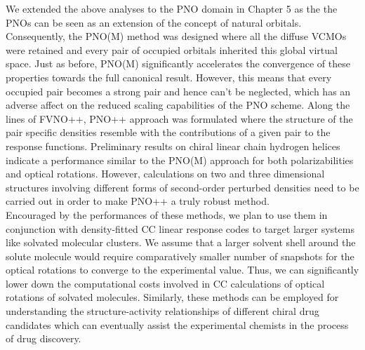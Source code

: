 We extended the above analyses to the PNO domain in Chapter 5 as the  
the PNOs can be seen as an extension of the concept of 
natural orbitals. Consequently, the PNO(M) method was designed where
all the diffuse VCMOs were retained and every pair of occupied orbitals
inherited this global virtual space. Just as before, PNO(M) significantly
accelerates the convergence of these properties towards the full
canonical result. However, this means that every occupied pair becomes a 
strong pair and hence can't be neglected, which has an adverse affect
on the reduced scaling capabilities of the PNO scheme. Along the 
lines of FVNO++, PNO++ approach was formulated where the structure of 
the pair specific densities resemble with the contributions of a given
pair to the response functions. Preliminary results on chiral linear chain 
hydrogen helices indicate a performance similar to the PNO(M) approach
for both polarizabilities and optical rotations. However, calculations on 
two and three dimensional structures involving different forms of second-order 
perturbed densities need to be carried out in order to make PNO++ a truly robust method. \\
Encouraged by the performances of these methods, we plan to use them in 
conjunction with density-fitted CC linear response codes\cite{Friese12} to target larger
systems like solvated molecular clusters. We assume that a larger solvent shell 
around the solute molecule would require comparatively smaller number of 
snapshots for the optical rotations to converge to the experimental value. Thus, we can significantly
lower down the computational costs involved in CC calculations of optical rotations
of solvated molecules. Similarly, these methods can be employed for understanding the structure-activity
relationships of different chiral drug candidates which can eventually assist the experimental chemists 
in the process of drug discovery.


